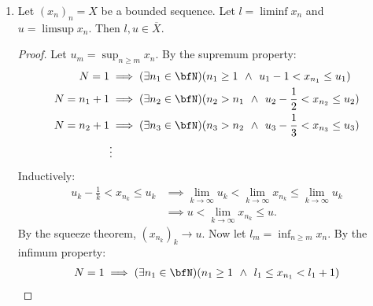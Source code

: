 \begin{enumerate}[label = (\arabic*)]
        \item Let $(x_n)_n = X$ be a bounded sequence. Let $l = \liminf x_n$ and $u = \limsup x_n$. Then $l,u \in \overline{X}$.
            {\color{red} \begin{proof}
                Let $u_m = \sup_{n \geq m}x_n$. By the supremum property:
                    \begin{equation*}
                    \begin{split}
                        N = 1 &\implies (\exists n_1 \in \bfN)(n_1 \geq 1 \hspace{4pt}\land\hspace{4pt} u_1-1 < x_{n_1} \leq u_1)\\
                        N = n_1 + 1 &\implies (\exists n_2 \in \bfN)(n_2 > n_1 \hspace{4pt}\land\hspace{4pt} u_2-\frac{1}{2} < x_{n_2} \leq u_2)\\
                        N = n_2 + 1 &\implies (\exists n_3 \in \bfN)(n_3 > n_2 \hspace{4pt}\land\hspace{4pt} u_3-\frac{1}{3} < x_{n_3} \leq u_3)\\
                        &\vdots
                    \end{split}
                    \end{equation*}
                Inductively:
                    \begin{equation*}
                    \begin{split}
                        u_k - \frac{1}{k} < x_{n_k} \leq u_k 
                        & \implies \lim_{k \rightarrow \infty} u_k < \lim_{k \rightarrow \infty}x_{n_k} \leq \lim_{k \rightarrow \infty}u_k \\
                        & \implies u < \lim_{k \rightarrow \infty}x_{n_k} \leq u.
                    \end{split}
                    \end{equation*}
                By the squeeze theorem, $(x_{n_k})_k \rightarrow u$. Now let $l_m = \inf_{n \geq m} x_n$. By the infimum property:
                    \begin{equation*}
                    \begin{split}
                        N = 1 &\implies (\exists n_1 \in \bfN)(n_1 \geq 1 \hspace{4pt}\land\hspace{4pt} l_1 \leq x_{n_1} < l_1 + 1)\\

\end{split}
\end{equation*}
\end{proof}}
\end{enumerate}

